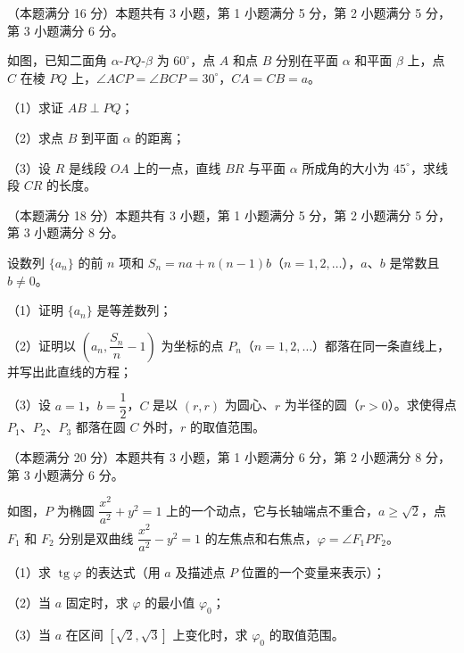 \Needspace{0.4\textheight}
\begin{question}
（本题满分 16 分）本题共有 3 小题，第 1 小题满分 5 分，第 2 小题满分 5 分，第 3 小题满分 6 分。

如图，已知二面角 $\alpha\text{-}PQ\text{-}\beta$ 为 $60^\circ$，点 $A$ 和点 $B$ 分别在平面 $\alpha$ 和平面 $\beta$ 上，点 $C$ 在棱 $PQ$ 上，$\angle ACP=\angle BCP=30^\circ$，$CA=CB=a$。

（1）求证 $AB\perp PQ$；

（2）求点 $B$ 到平面 $\alpha$ 的距离；

（3）设 $R$ 是线段 $OA$ 上的一点，直线 $BR$ 与平面 $\alpha$ 所成角的大小为 $45^\circ$，求线段 $CR$ 的长度。
\nopagebreak[4]
\begin{center}\end{center}
\nopagebreak[4]
\end{question}
\begin{question}
（本题满分 18 分）本题共有 3 小题，第 1 小题满分 5 分，第 2 小题满分 5 分，第 3 小题满分 8 分。

设数列 $\{a_n\}$ 的前 $n$ 项和 $S_n=na+n(n-1)b$（$n=1,2,\ldots$），$a$、$b$ 是常数且 $b\ne 0$。

（1）证明 $\{a_n\}$ 是等差数列；

（2）证明以 $\left(a_n,\dfrac{S_n}{n}-1\right)$ 为坐标的点 $P_n$（$n=1,2,\ldots$）都落在同一条直线上，并写出此直线的方程；

（3）设 $a=1$，$b=\dfrac12$，$C$ 是以 $(r,r)$ 为圆心、$r$ 为半径的圆（$r>0$）。求使得点 $P_1$、$P_2$、$P_3$ 都落在圆 $C$ 外时，$r$ 的取值范围。

\Needspace{0.4\textheight}
\end{question}
\begin{question}
（本题满分 20 分）本题共有 3 小题，第 1 小题满分 6 分，第 2 小题满分 8 分，第 3 小题满分 6 分。

如图，$P$ 为椭圆 $\dfrac{x^2}{a^2}+y^2=1$ 上的一个动点，它与长轴端点不重合，$a\ge\sqrt2$，点 $F_1$ 和 $F_2$ 分别是双曲线 $\dfrac{x^2}{a^2}-y^2=1$ 的左焦点和右焦点，$\varphi=\angle F_1PF_2$。

（1）求 $\operatorname{tg}\varphi$ 的表达式（用 $a$ 及描述点 $P$ 位置的一个变量来表示）；

（2）当 $a$ 固定时，求 $\varphi$ 的最小值 $\varphi_0$；

（3）当 $a$ 在区间 $[\sqrt2,\sqrt3]$ 上变化时，求 $\varphi_0$ 的取值范围。
\nopagebreak[4]
\begin{center}\end{center}
\nopagebreak[4]

\end{question}
